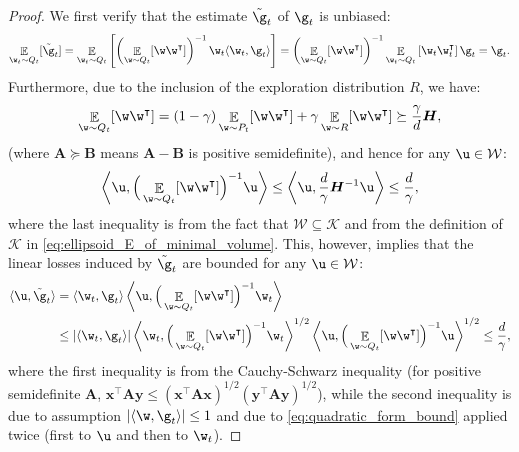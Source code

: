 \documentclass{colt2018} %
\DeclareMathOperator*{\E}{\mathbb{E}}
\renewcommand{\top}{\intercal}
\newcommand{\domainw}{\mathcal{W}}
\newcommand{\inner}[2]{\langle #1, #2 \rangle}  %
\begin{document}
\begin{proof}
  We first verify that the estimate $\tilde{\g}_t$ of $\g_t$ is unbiased:
\[
\E_{\w_t \sim Q_t}[\tilde{\g}_t] 
= \E_{\w_t \sim Q_t}\left[\left(\E_{\w \sim Q_t}[\w\w^\top]\right)^{-1} \w_t \inner{\w_t}{\g_t}  \right]
= \left(\E_{\w \sim Q_t}[\w\w^\top]\right)^{-1} \E_{\w_t \sim Q_t}\left[\w_t \w_t^\top \right] \g_t
= \g_t.
\]
Furthermore, due to the inclusion of the exploration
distribution $R$, we have:
\[
  \E_{\w \sim Q_t}[\w\w^\top]
  = (1-\gamma) \E_{\w \sim P_t}[\w\w^\top] + \gamma \E_{\w \sim R}[\w\w^\top]
  \succeq \frac{\gamma}{d} \boldsymbol{H},
\]
(where $\boldsymbol{A} \succeq \boldsymbol{B}$ means $\boldsymbol{A} - \boldsymbol{B}$
is positive semidefinite), and hence for any $\u \in \domainw$:
\begin{equation}
\left \langle \u, \Big(\E_{\w \sim Q_t}[\w\w^\top]\Big)^{-1} \u \right \rangle
\leq \left \langle \u, \frac{d}{\gamma} \boldsymbol{H}^{-1} \u \right \rangle
\leq \frac{d}{\gamma}, 
  \label{eq:quadratic_form_bound}
\end{equation}
where the last inequality is from the fact that $\domainw \subseteq \mathcal{K}$
and from the definition of $\mathcal{K}$ in \eqref{eq:ellipsoid_E_of_minimal_volume}.
This, however, implies that the linear losses induced by $\tilde{\g}_t$
are bounded for any $\u \in \domainw$:
\begin{align}
  \inner{\u}{\tilde{\g}_t} 
  &= \inner{\w_t}{\g_t} \left \langle \u,
    \Big(\E_{\w \sim Q_t}[\w\w^\top]\Big)^{-1} \w_t \right \rangle \nonumber \\
  &\leq |\inner{\w_t}{\g_t}| \left \langle \w_t,
  \Big(\E_{\w \sim Q_t}[\w\w^\top]\Big)^{-1} \w_t \right \rangle^{1/2}
    \left \langle \u,
  \Big(\E_{\w \sim Q_t}[\w\w^\top]\Big)^{-1} \u \right \rangle^{1/2} \leq \frac{d}{\gamma},
  \label{eq:bound_on_the_loss_estimate}
\end{align}
where the first inequality is from the Cauchy-Schwarz inequality
(for positive semidefinite $\boldsymbol{A}$, 
$\boldsymbol{x}^\top \boldsymbol{A} \boldsymbol{y}
\leq (\boldsymbol{x}^\top \boldsymbol{A} \boldsymbol{x})^{1/2}
(\boldsymbol{y}^\top \boldsymbol{A} \boldsymbol{y})^{1/2}$),
while the second inequality is due to 
assumption $|\inner{\w}{\g_t}| \leq 1$ and 
due to \eqref{eq:quadratic_form_bound} applied twice (first to $\u$ and
then to $\w_t$).


\end{proof}
\end{document}
